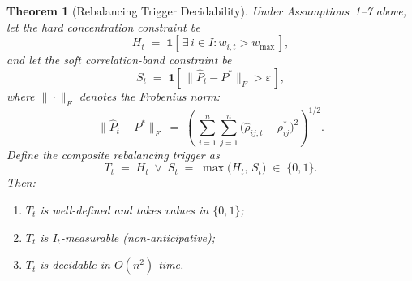 \documentclass[12pt,openany]{book}
\numberwithin{equation}{chapter}
\theoremstyle{plain}
\newtheorem{theorem}{Theorem}[chapter]
\theoremstyle{definition}
\theoremstyle{remark}
\def\mathcal#1{#1}%
\begin{document}
\begin{theorem}[Rebalancing Trigger Decidability]
\label{thm:rebalance-trigger}
Under Assumptions~1--7 above, let the hard concentration constraint
be
\begin{equation}
  H_t \;=\; \mathbf{1}\!\left[\,\exists\, i \in \mathcal{I} :
    w_{i,t} > w_{\max}\,\right],
  \label{eq:hard-indicator}
\end{equation}
and let the soft correlation-band constraint be
\begin{equation}
  S_t \;=\; \mathbf{1}\!\left[\,
    \|\hat{P}_t - P^*\|_F > \varepsilon\,\right],
  \label{eq:soft-indicator}
\end{equation}
where $\|\cdot\|_F$ denotes the Frobenius norm:
\begin{equation}
  \|\hat{P}_t - P^*\|_F
  \;=\;
  \left(\,\sum_{i=1}^{n}\sum_{j=1}^{n}
    \bigl(\hat{\rho}_{ij,t} - \rho^*_{ij}\bigr)^2
  \right)^{\!1/2}.
  \label{eq:frobenius-def}
\end{equation}
Define the composite rebalancing trigger as
\begin{equation}
  T_t \;=\; H_t \;\vee\; S_t
  \;=\;
  \max\!\bigl(H_t,\, S_t\bigr)
  \;\in\; \{0, 1\}.
  \label{eq:rebalance-trigger}
\end{equation}
Then:
\begin{enumerate}
  \item[(i)] $T_t$ is well-defined and takes values in $\{0,1\}$;
  \item[(ii)] $T_t$ is $\mathcal{I}_t$-measurable (non-anticipative);
  \item[(iii)] $T_t$ is decidable in $O(n^2)$ time.
\end{enumerate}
\end{theorem}
\end{document}
